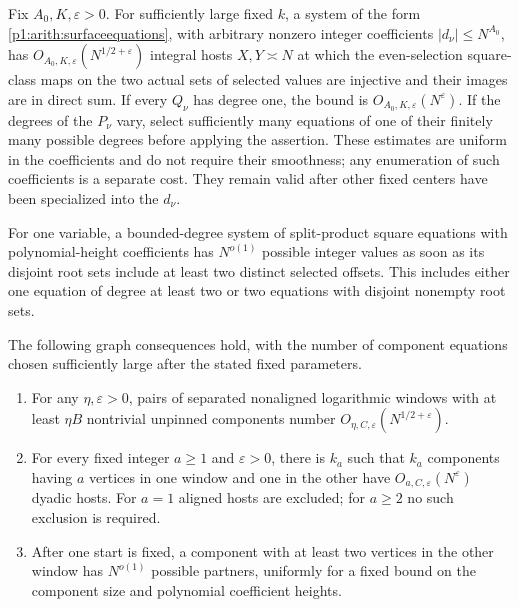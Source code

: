 \begin{lemma}\label{p1:arith:geometric}
Fix $A_0,K,\varepsilon>0$.  For sufficiently large fixed $k$, a system
of the form \eqref{p1:arith:surfaceequations}, with arbitrary nonzero integer
coefficients $|d_\nu|\leq N^{A_0}$, has
$O_{A_0,K,\varepsilon}(N^{1/2+\varepsilon})$ integral hosts
$X,Y\asymp N$ at which the even-selection square-class maps on the
two actual sets of selected values are injective and their images are
in direct sum.  If every $Q_\nu$ has degree one, the bound is
$O_{A_0,K,\varepsilon}(N^\varepsilon)$.  If the degrees of the $P_\nu$
vary, select sufficiently many equations of one of their finitely many
possible degrees before applying the assertion.
These estimates are uniform in the coefficients and do not require their
smoothness; any enumeration of such coefficients is a separate cost.
They remain valid after other fixed centers have been specialized into
the $d_\nu$.

For one variable, a bounded-degree system of split-product square equations
with polynomial-height coefficients has $N^{o(1)}$ possible integer values
as soon as its disjoint root sets include at least two distinct selected
offsets.  This includes either one equation of degree at least two or
two equations with disjoint nonempty root sets.

The following graph consequences hold, with the number of component
equations chosen sufficiently large after the stated fixed parameters.
\begin{enumerate}
\item For any $\eta,\varepsilon>0$, pairs of separated nonaligned
logarithmic windows with at least $\eta B$ nontrivial unpinned components
number $O_{\eta,C,\varepsilon}(N^{1/2+\varepsilon})$.
\item For every fixed integer $a\geq1$ and $\varepsilon>0$, there is
$k_a$ such that $k_a$ components having $a$ vertices in one window and
one in the other have $O_{a,C,\varepsilon}(N^\varepsilon)$ dyadic hosts.
For $a=1$ aligned hosts are excluded; for $a\geq2$ no such exclusion
is required.
\item After one start is fixed, a component with at least two vertices
in the other window has $N^{o(1)}$ possible partners, uniformly for a
fixed bound on the component size and polynomial coefficient heights.
\end{enumerate}
\end{lemma}

